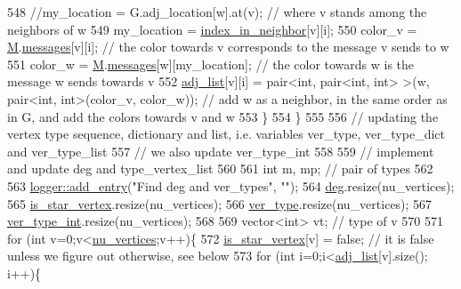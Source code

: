 \begin{DoxyCode}
548       \textcolor{comment}{//my\_location = G.adj\_location[w].at(v); // where v stands among the neighbors of w}
549       my\_location = \hyperlink{classcolored__graph_ae28fcd089f9785204d76b6a608bed54f}{index\_in\_neighbor}[v][i]; 
550       color\_v = \hyperlink{classcolored__graph_ab72c568fe12f7c849ca6bffb145aec47}{M}.\hyperlink{classgraph__message_af680c8a1755cf8d4aba389c1a3d6634e}{messages}[v][i]; \textcolor{comment}{// the color towards v corresponds to the message v sends to w}
551       color\_w = \hyperlink{classcolored__graph_ab72c568fe12f7c849ca6bffb145aec47}{M}.\hyperlink{classgraph__message_af680c8a1755cf8d4aba389c1a3d6634e}{messages}[w][my\_location]; \textcolor{comment}{// the color towards w is the message w sends towards
       v}
552       \hyperlink{classcolored__graph_a45dce16965079286cf3f41a54a1b2ea4}{adj\_list}[v][i] = pair<int, pair<int, int> >(w, pair<int, int>(color\_v, color\_w)); \textcolor{comment}{// add w as
       a neighbor, in the same order as in G, and add the colors towards v and w }
553     \}
554   \}
555 
556   \textcolor{comment}{// updating the vertex type sequence, dictionary and list, i.e. variables ver\_type, ver\_type\_dict and
       ver\_type\_list}
557   \textcolor{comment}{// we also update ver\_type\_int}
558 
559   \textcolor{comment}{// implement and update deg and type\_vertex\_list}
560   
561   \textcolor{keywordtype}{int} m, mp; \textcolor{comment}{// pair of types}
562 
563   \hyperlink{classlogger_a710163deb17bc81f70d53d285b8ac9ac}{logger::add\_entry}(\textcolor{stringliteral}{"Find deg and ver\_types"}, \textcolor{stringliteral}{""});
564   \hyperlink{classcolored__graph_ae3269d35c1b022bc70d195bebd4e1b8a}{deg}.resize(nu\_vertices);
565   \hyperlink{classcolored__graph_ad41163e970530c7e45878d299f0dc961}{is\_star\_vertex}.resize(nu\_vertices);
566   \hyperlink{classcolored__graph_a2cc32e7146fa3319f83cfa940f5e1be4}{ver\_type}.resize(nu\_vertices);
567   \hyperlink{classcolored__graph_a491ed2ea1a65118af02ec606c8d44c0a}{ver\_type\_int}.resize(nu\_vertices);
568 
569   vector<int> vt; \textcolor{comment}{// type of v}
570 
571   \textcolor{keywordflow}{for} (\textcolor{keywordtype}{int} v=0;v<\hyperlink{classcolored__graph_a90ece8eb1fec52f3f41549ab527c1d5b}{nu\_vertices};v++)\{
572     \hyperlink{classcolored__graph_ad41163e970530c7e45878d299f0dc961}{is\_star\_vertex}[v] = \textcolor{keyword}{false}; \textcolor{comment}{// it is false unless we figure out otherwise, see below}
573     \textcolor{keywordflow}{for} (\textcolor{keywordtype}{int} i=0;i<\hyperlink{classcolored__graph_a45dce16965079286cf3f41a54a1b2ea4}{adj\_list}[v].size(); i++)\{

\end{DoxyCode}
